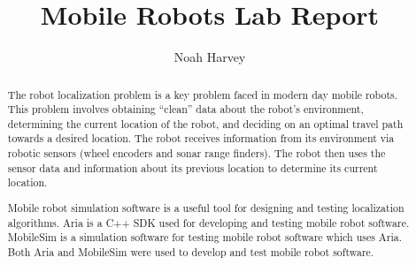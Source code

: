 \documentclass[a4paper,titlepage]{article}
\begin{document}
	\title{Mobile Robots Lab Report}
	\author{Noah Harvey}
	\maketitle

	\begin{abstract}

	The robot localization problem is a key problem faced in modern day mobile
	robots. This problem involves obtaining ``clean'' data about the robot's
	environment, determining the current location of the robot, and deciding on an
	optimal travel path towards a desired location. The robot receives information
	from its environment via robotic sensors (wheel encoders and sonar range
	finders). The robot then uses the sensor data and information about its
	previous location to determine its current location.

	Mobile robot simulation software is a useful tool for designing and testing
	localization algorithms. Aria is a C++ SDK used for developing and
	testing mobile robot software. MobileSim is a simulation software
	for testing mobile robot software which uses Aria. Both Aria and MobileSim
	were used to develop and test mobile robot software.
	
	\end{abstract}

	\tableofcontents
	\listoftables
	\listoffigures

	\pagebreak
	
	
	
	
\end{document}
